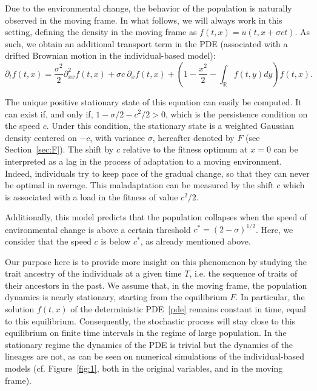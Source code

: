 \documentclass[10pt]{amsart}
\theoremstyle{definition}\newtheorem{defi}[theo]{Definition}\newtheorem{rema}[theo]{Remark}\newtheorem{exam}[theo]{Example}\newtheorem{exem}[theo]{Example}\newtheorem{nota}[theo]{Notation}
\newcommand*\R{\mathbb{R}}
\begin{document}
Due to the environmental change, the behavior of the population is naturally observed in the moving frame. In what follows, we will always work in this setting, defining the density in the moving frame as $f(t,x)=u(t,x+\sigma c t)$. As such, we obtain an additional transport term in the PDE (associated with a drifted Brownian motion in the individual-based model):
\begin{equation}\label{pde}
\partial_{t}f(t,x)=\frac{\sigma^2}{2}\partial^2_{xx} f(t,x)+ \sigma c \ \partial_{x}f(t,x) + \left(1-\frac{x^2}{2}-\int_{\R}f(t,y)dy \right)f(t,x).
\end{equation}


The unique positive stationary state of this equation can easily be computed. It can exist if, and only if, $1-\sigma/2-c^2/2>0$, which is the persistence condition on the speed $c$. Under this condition, the stationary state is a weighted Gaussian density centered on $-c$, with variance $\sigma$, hereafter denoted by $F$ (see Section~\ref{sec:F}). The shift by $c$ relative to the fitness optimum at $x=0$ can be interpreted as a lag in the process of adaptation to a moving environment. Indeed, individuals try to keep pace of the gradual change, so that they can never be optimal in average. This maladaptation can be measured by the shift $c$ which is associated with a load in the fitness of value $c^2/2$.

Additionally, this model predicts that the population collapses when the speed of environmental change is above a certain threshold $c^* = (2 - \sigma)^{1/2}$. Here, we consider that the speed $c$ is below $c^*$, as already mentioned above.

Our purpose here is to provide more insight on this phenomenon by studying the trait ancestry of the individuals at a given time $T$, i.e. the sequence of traits of their ancestors in the past. We assume that, in the moving frame, the population dynamics is nearly stationary, starting from the equilibrium $F$. In particular, the solution $f(t,x)$ of the deterministic PDE~\eqref{pde} remains constant in time, equal to this equilibrium. Consequently, the stochastic process will stay close to this equilibrium on finite time intervals in the regime of large population. In the stationary regime the dynamics of the PDE is trivial but the dynamics of the lineages are not, as can be seen on numerical simulations of the individual-based models (cf. Figure~\ref{fig:1}, both in the original variables, and in the moving frame).
\end{document}
